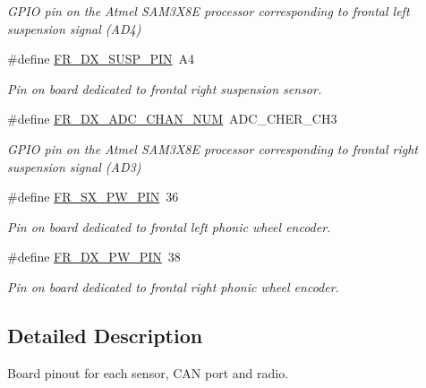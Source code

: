 \begin{DoxyCompactItemize}
\begin{DoxyCompactList}\small\item\em G\+P\+IO pin on the Atmel S\+A\+M3\+X8E processor corresponding to frontal left suspension signal (A\+D4) \end{DoxyCompactList}\item 
\mbox{\label{group___board__pinout__group_gac6b52ca09115f1f82aa92ffd31363c05}} 
\#define \mbox{\hyperlink{group___board__pinout__group_gac6b52ca09115f1f82aa92ffd31363c05}{F\+R\+\_\+\+D\+X\+\_\+\+S\+U\+S\+P\+\_\+\+P\+IN}}~A4
\begin{DoxyCompactList}\small\item\em Pin on board dedicated to frontal right suspension sensor. \end{DoxyCompactList}\item 
\mbox{\label{group___board__pinout__group_ga9d0085cf869db954c00e9c13d9661d51}} 
\#define \mbox{\hyperlink{group___board__pinout__group_ga9d0085cf869db954c00e9c13d9661d51}{F\+R\+\_\+\+D\+X\+\_\+\+A\+D\+C\+\_\+\+C\+H\+A\+N\+\_\+\+N\+UM}}~A\+D\+C\+\_\+\+C\+H\+E\+R\+\_\+\+C\+H3
\begin{DoxyCompactList}\small\item\em G\+P\+IO pin on the Atmel S\+A\+M3\+X8E processor corresponding to frontal right suspension signal (A\+D3) \end{DoxyCompactList}\item 
\mbox{\label{group___board__pinout__group_ga283872484ffa2d7043a08a80ff7a6cbc}} 
\#define \mbox{\hyperlink{group___board__pinout__group_ga283872484ffa2d7043a08a80ff7a6cbc}{F\+R\+\_\+\+S\+X\+\_\+\+P\+W\+\_\+\+P\+IN}}~36
\begin{DoxyCompactList}\small\item\em Pin on board dedicated to frontal left phonic wheel encoder. \end{DoxyCompactList}\item 
\mbox{\label{group___board__pinout__group_gad70d75cffb6389aff09c9d9b67a70777}} 
\#define \mbox{\hyperlink{group___board__pinout__group_gad70d75cffb6389aff09c9d9b67a70777}{F\+R\+\_\+\+D\+X\+\_\+\+P\+W\+\_\+\+P\+IN}}~38
\begin{DoxyCompactList}\small\item\em Pin on board dedicated to frontal right phonic wheel encoder. \end{DoxyCompactList}\end{DoxyCompactItemize}


\subsection{Detailed Description}
Board pinout for each sensor, C\+AN port and radio. 
